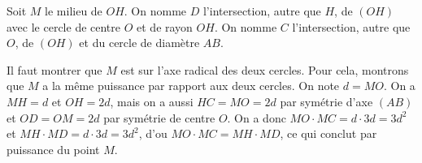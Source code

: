 \begin{sol}
\begin{center}
\end{center}

Soit $M$ le milieu de $OH$. On nomme $D$ l'intersection, autre que $H$, de $\left(OH\right)$ avec le cercle de centre $O$ et de rayon $OH$. On nomme $C$ l'intersection, autre que $O$, de $\left(OH\right)$ et du cercle de diamètre $AB$.

Il faut montrer que $M$ est sur l'axe radical des deux cercles. Pour cela, montrons que $M$ a la même puissance par rapport aux deux cercles. On note $d=MO$. On a $MH=d$ et $OH=2d$, mais on a aussi $HC=MO=2d$ par symétrie d'axe $\left(AB\right)$ et $OD = OM = 2d$ par symétrie de centre $O$. On a donc $MO \cdot MC = d \cdot 3d = 3d^2$ et $MH \cdot MD = d \cdot 3d = 3d^2$, d'ou $MO \cdot MC = MH \cdot MD$, ce qui conclut par puissance du point $M$.
\end{sol}


